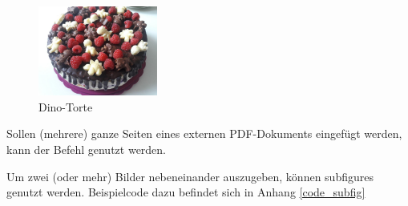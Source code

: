 \begin{figure}[h]
\centering
\includegraphics[trim = 6cm 3cm 6cm 1cm,clip , width = 0.35\textwidth]{Bilder/dinotorte}
\caption{Dino-Torte}
\end{figure}

Sollen (mehrere) ganze Seiten eines externen PDF-Dokuments eingefügt werden, kann der Befehl \verb++ genutzt werden. 

\smallskip
Um zwei (oder mehr) Bilder nebeneinander auszugeben, können subfigures genutzt werden. Beispielcode dazu befindet sich in Anhang \ref{code_subfig}
